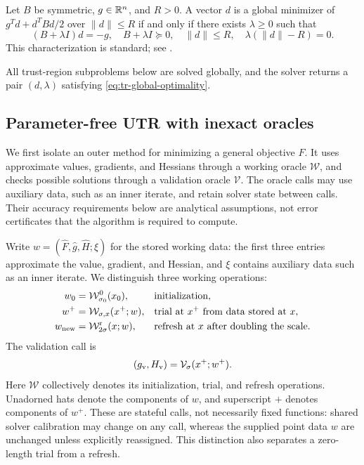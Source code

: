\documentclass{article}
\begin{document}
\begin{lemma}
\label{lem:tr-optimality}
Let $B$ be symmetric, $g\in\mathbb{R}^n$, and $R>0$.  A vector $d$ is a
global minimizer of $g^Td+d^TBd/2$ over $\|d\|\le R$ if and only if
there exists $\lambda\ge0$ such that
\begin{equation}\label{eq:tr-global-optimality}
 (B+\lambda I)d=-g,\quad B+\lambda I\succeq0,\quad
 \|d\|\le R,\quad \lambda(\|d\|-R)=0.
\end{equation}
This characterization is standard; see
\citet[Section~8.7]{luenberger2021linear}.
\end{lemma}

All trust-region subproblems below are solved globally, and the solver
returns a pair $(d,\lambda)$ satisfying \eqref{eq:tr-global-optimality}.


\subsection{Parameter-free UTR with inexact oracles}
\label{sec:adaptive-utr}

We first isolate an outer method for minimizing a general objective
$F$.  It uses approximate values, gradients, and Hessians through a
working oracle $\mathcal W$, and checks possible solutions through a
validation oracle $\mathcal V$.  The oracle calls may use auxiliary
data, such as an inner iterate, and retain solver state between calls.
Their accuracy requirements below are analytical assumptions, not
error certificates that the algorithm is required to compute.

Write $w=(\widehat F,\widehat g,\widehat H;\xi)$ for the stored
working data: the first three entries approximate the value, gradient,
and Hessian, and $\xi$ contains auxiliary data such as an inner iterate.
We distinguish three working operations:
\begin{equation}\label{eq:utr-oracle-interface}
\begin{aligned}
 w_0&=\mathcal W^0_{\sigma_0}(x_0),
 &&\text{initialization},\\
 w^+&=\mathcal W_{\sigma,x}(x^+;w),
 &&\text{trial at $x^+$ from data stored at $x$},\\
 w_{\rm new}&=\mathcal W^{\rm r}_{2\sigma}(x;w),
 &&\text{refresh at $x$ after doubling the scale}.
\end{aligned}
\end{equation}
The validation call is
\begin{equation}\label{eq:utr-validation-interface}
 (g_{\rm v},H_{\rm v})=\mathcal V_\sigma(x^+;w^+).
\end{equation}
Here $\mathcal W$ collectively denotes its initialization, trial,
and refresh operations.  Unadorned hats denote the components of $w$,
and superscript $+$ denotes components of $w^+$.
These are stateful calls, not necessarily fixed functions: shared
solver calibration may change on any call, whereas the supplied
point data $w$ are unchanged unless explicitly reassigned.
This distinction also separates a zero-length trial from a refresh.
\end{document}
